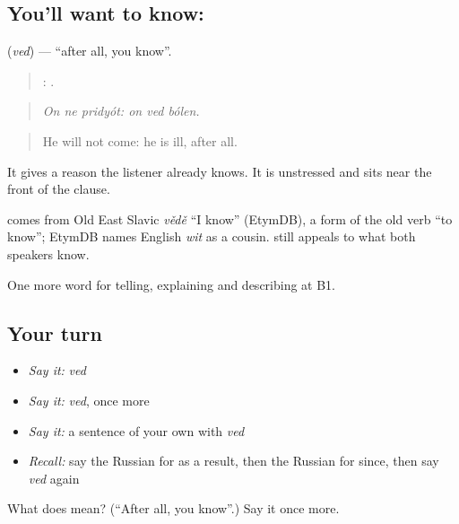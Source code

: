 \subsection*{You'll want to know: }
\textbf{} (\emph{ved}) — \textquotedblleft{}after all, you know\textquotedblright{}.

\begin{quote}
  :   .
\end{quote}

\begin{quote}
\emph{On ne pridyót: on ved bólen.}
\end{quote}

\begin{quote}
He will not come: he is ill, after all.
\end{quote}

It gives a reason the listener already knows. It is unstressed and sits near the front of the clause.

\begin{cousinweb}
\textbf{} comes from Old East Slavic \emph{vědě} \textquotedblleft{}I know\textquotedblright{} (EtymDB), a form of the old verb \emph{} \textquotedblleft{}to know\textquotedblright{}; EtymDB names English \emph{wit} as a cousin. \emph{} still appeals to what both speakers know.
\end{cousinweb}

\begin{grammarlens}[title={What you've built}]
One more word for telling, explaining and describing at B1.
\end{grammarlens}

\subsection*{Your turn}
\begin{itemize}
\raggedright
  \item \emph{Say it:} \emph{ved}
  \item \emph{Say it:} \emph{ved}, once more
  \item \emph{Say it:} a sentence of your own with \emph{ved}
  \item \emph{Recall:} say the Russian for as a result, then the Russian for since, then say \emph{ved} again
\end{itemize}

\begin{tcolorbox}[breakable,colback=teal!4,colframe=teal!35!black,title={Before you move on}]
What does  mean? (\textquotedblleft{}After all, you know\textquotedblright{}.) Say it once more.
\end{tcolorbox}
